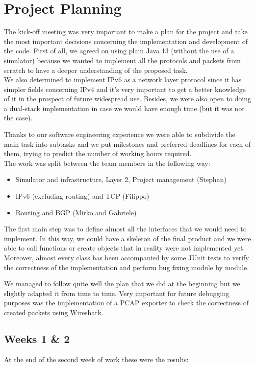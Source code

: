 \chapter{Project Planning}\label{projPlan}
The kick-off meeting was very important to make a plan for the project and take the most important decisions concerning the implementation and development of the code.
First of all, we agreed on using plain Java 13 (without the use of a simulator) because we wanted to implement all the protocols and packets from scratch to have a deeper understanding of the proposed task.\\
We also determined to implement IPv6 as a network layer protocol since it has simpler fields concerning IPv4 and it's very important to get a better knowledge of it in the prospect of future widespread use. Besides, we were also open to doing a dual-stack implementation in case we would have enough time (but it was not the case).

Thanks to our software engineering experience we were able to subdivide the main task into subtasks and we put milestones and preferred deadlines for each of them, trying to predict the number of working hours required.\\
The work was split between the team members in the following way:
\begin{itemize}
 \item Simulator and infrastructure, Layer 2, Project management (Stephan)
 \item IPv6 (excluding routing) and TCP (Filippo)
 \item Routing and BGP (Mirko and Gabriele)
\end{itemize}

The first main step was to define almost all the interfaces that we would need to implement.
In this way, we could have a skeleton of the final product and we were able to call functions or create objects that in reality were not implemented yet.
Moreover, almost every class has been accompanied by some JUnit tests to verify the correctness of the implementation and perform bug fixing module by module.

We managed to follow quite well the plan that we did at the beginning but we slightly adapted it from time to time.
Very important for future debugging purposes was the implementation of a PCAP exporter to check the correctness of created packets using Wireshark.

\section{Weeks 1 \& 2}
At the end of the second week of work these were the results:

